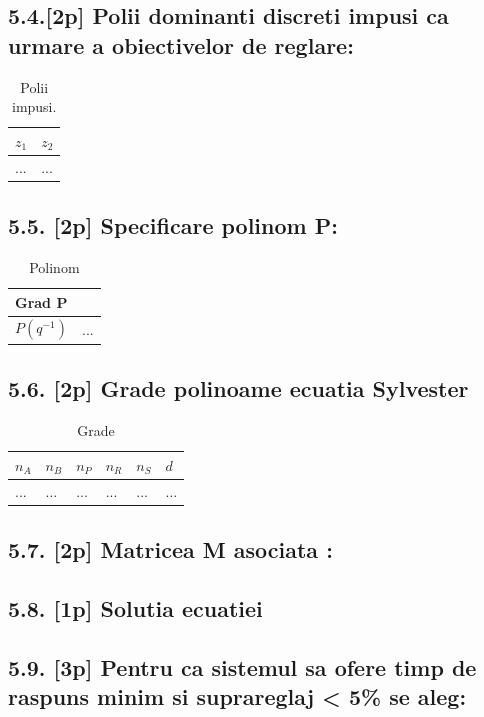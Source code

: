 \documentclass[12pt,english]{article}
\begin{document}
\subsection {5.4.[2p] Polii dominanti discreti impusi ca urmare a obiectivelor de reglare: }
\begin{table}[H]
  \centering
    \begin{tabular}{|l|l|}
      \hline
      $z_1$ & $z_2$ \\
      \hline
      ... & ... \\
      \hline
    \end{tabular}
    \caption{Polii impusi.}
\end{table}

\subsection {5.5. [2p] Specificare polinom P: }
\begin{table}[H]
  \centering
    \begin{tabular}{|l|l|}
      \hline
      Grad P &  \\
      \hline
      $P(q^{-1})$ & ... \\
      \hline
    \end{tabular}
    \caption{Polinom}
\end{table}

\subsection {5.6. [2p] Grade polinoame ecuatia Sylvester }
\begin{table}[H]
  \centering
    \begin{tabular}{|l|l|l|l|l|l|}
      \hline
      $n_A$ & $n_B$ & $n_P$ & $n_R$ & $n_S$ & $d$ \\
      \hline
      ... & ... & ... & ... & ... & ... \\
      \hline
    \end{tabular}
    \caption{Grade}
\end{table}

\subsection {5.7. [2p]  Matricea M asociata : }
\subsection {5.8. [1p] Solutia ecuatiei}
\subsection {5.9. [3p] Pentru ca sistemul sa ofere timp de raspuns minim si suprareglaj < 5\% se aleg: }
\end{document}

